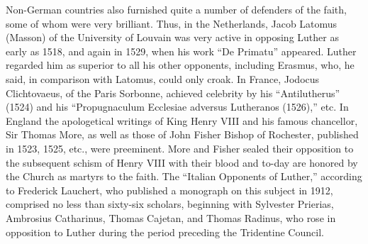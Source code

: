 Non-German countries also furnished quite a number of defenders
of the faith, some of whom were very brilliant. Thus, in the Netherlands,
Jacob Latomus (Masson) of the University of Louvain was
very active in opposing Luther as early as 1518, and again in 1529,
when his work “De Primatu” appeared. Luther regarded him as
superior to all his other opponents, including Erasmus, who, he
said, in comparison with Latomus, could only croak. In France, Jodocus
Clichtovaeus, of the Paris Sorbonne, achieved celebrity by his
“Antilutherus” (1524) and his “Propugnaculum Ecclesiae adversus
Lutheranos (1526),” etc. In England the apologetical writings of
King Henry VIII and his famous chancellor, Sir Thomas More, as well
as those of John Fisher Bishop of Rochester, published in 1523, 1525,
etc., were preeminent. More and Fisher sealed their opposition to the
subsequent schism of Henry VIII with their blood and to-day are
honored by the Church as martyrs to the faith. The “Italian Opponents of
Luther,” according to Frederick Lauchert, who published a
monograph on this subject in 1912, comprised no less than sixty-six
scholars, beginning with Sylvester Prierias, Ambrosius Catharinus,
Thomas Cajetan, and Thomas Radinus, who rose in opposition to
Luther during the period preceding the Tridentine Council.
